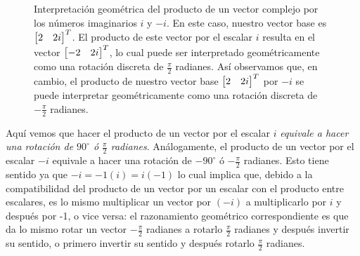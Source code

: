 \documentclass[12pt]{article}
\begin{document}
\begin{figure}[h!]
    \centering
    \caption{Interpretación geométrica del producto de un vector complejo por los números imaginarios $i$ y $-i$. En este caso, nuestro vector base es $\protect\begin{bmatrix} 2 & 2i \protect\end{bmatrix}^T$. El producto de  este vector por el escalar $i$ resulta en el vector $\protect\begin{bmatrix} -2 & 2i \end{bmatrix}^T$, lo cual puede ser interpretado geométricamente como una rotación discreta de $\frac{\pi}{2}$ radianes. Así observamos que, en cambio, el producto de nuestro vector base $\protect\begin{bmatrix} 2 & 2i \protect\end{bmatrix}^T$ por $-i$ se puede interpretar geométricamente como una rotación discreta de $-\frac{\pi}{2}$ radianes.}
    \label{fig:Producto_de_un_vector_complejo_por_i}
\end{figure}

   Aquí vemos que hacer el producto de un vector por el escalar $i$ \emph{equivale a hacer una rotación de $90^\circ$ ó $\frac{\pi}{2}$ radianes}. Análogamente, el producto de un vector por el escalar $-i$ equivale a hacer una rotación de $-90^\circ$ ó $-\frac{\pi}{2}$ radianes. Esto tiene sentido ya que $-i=-1(i)=i(-1)$ lo cual implica que, debido a la compatibilidad del producto de un vector por un escalar con el producto entre escalares, es lo mismo multiplicar un vector por $(-i)$ a multiplicarlo por $i$ y después por -1, o vice versa: el razonamiento geométrico correspondiente es que da lo mismo rotar un vector $-\frac{\pi}{2}$ radianes a rotarlo $\frac{\pi}{2}$ radianes y después invertir su sentido, o primero invertir su sentido y después rotarlo $\frac{\pi}{2}$ radianes. 
\end{document}
